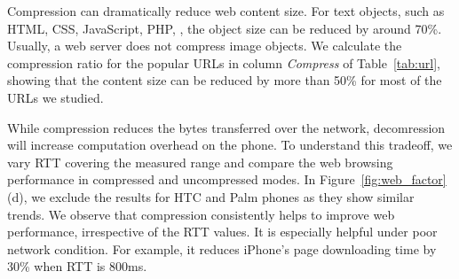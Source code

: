\label{sec:web_compress}

Compression can dramatically reduce web content size. For text objects, 
such as HTML, CSS, JavaScript, PHP, \etc, the object size can be reduced 
by around 70\%. Usually, a web server does not compress image objects.
We calculate the compression ratio for the popular URLs in column 
{\em Compress} of Table~\ref{tab:url}, showing that the content size 
can be reduced by more than 50\% for most of the URLs we studied.

While compression reduces the bytes transferred over the network, 
decomression will increase computation overhead on the phone. To
understand this tradeoff, we vary RTT covering the measured range
and compare the web browsing performance in compressed and 
uncompressed modes. In Figure~\ref{fig:web_factor}(d), we exclude the 
results for HTC and Palm phones as they show similar trends. We 
observe that compression consistently helps to improve web performance,
irrespective of the RTT values. It is especially helpful under 
poor network condition.
For example, it reduces iPhone's page 
downloading time by 30\% when RTT is 800ms. 

